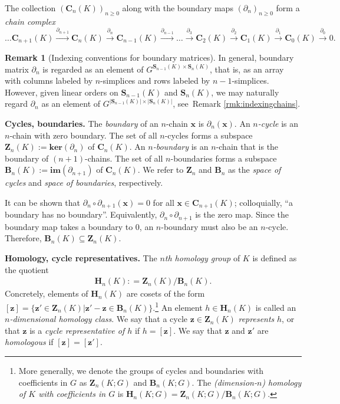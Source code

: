 \documentclass[utf8]{formatting_stuff/frontiersFPHY}
\newcommand{\Chains}{\mathbf{C}}
\newcommand{\Homologies}[0]{\mathbf{H}}
\newcommand{\Boundaries}[0]{\mathbf{B}}
\newcommand{\Simplices}[0]{\mathbf{S}}
\newcommand{\Cycles}[0]{\mathbf{Z}}
\newcommand{\optimalrep}{\mathbf{x}}
\newcommand{\cycle}{{\mathbf z}}
\theoremstyle{plain}
\theoremstyle{definition}
\newtheorem{remark}[theorem]{Remark}
\begin{document}
 
The collection  $(\Chains_n(K))_{n\geq 0}$ along with the boundary maps $(\partial_n)_{n\geq 0}$ form a \textit{chain complex}
\[\ldots \Chains_{n+1}(K) \xrightarrow{\partial_{n+1}} \Chains_{n}(K) \xrightarrow{\partial_{n}} \Chains_{n-1}(K) \xrightarrow{\partial_{n-1}} \ldots \xrightarrow{\partial_3} \Chains_2(K) \xrightarrow{\partial_2} \Chains_1(K) \xrightarrow{\partial_1} \Chains_0(K) \xrightarrow{\partial_0} 0. \]
 
\begin{remark}[{Indexing conventions for boundary matrices}]
\label{rmk:boundarymatrixindexing}
In general, boundary matrix $\partial_n$ is regarded as an element of $G^{\Simplices_{n-1}(K) \times \Simplices_{n}(K)}$, that is, as an array with columns labeled by $n$-simplices and rows labeled by $n-1$-simplices.  However, given linear orders on  $\Simplices_{n-1}(K)$ and $\Simplices_{n}(K)$, we may naturally regard $\partial_n$ as an element of $G^{|\Simplices_{n-1}(K)| \times |\Simplices_{n}(K)|}$, see\ Remark \ref{rmk:indexingchains}. 
\end{remark} 


\noindent \textbf{Cycles, boundaries.}  The \emph{boundary} of an $n$-chain $\optimalrep$ is  $\partial_n (\optimalrep)$.
An \textit{$n$-cycle} is an $n$-chain with zero boundary. The set of all $n$-cycles forms a subspace $\Cycles_n(K) := \textbf{ker}(\partial_n)$ of $\Chains_n(K).$ An \textit{$n$-boundary} is an $n$-chain that is the boundary of $(n+1)$-chains. The set of all $n$-boundaries forms a subspace $\Boundaries_n(K):= \textbf{im}(\partial_{n+1})$ of $\Chains_n(K).$   We refer to $\Cycles_n$ and $\Boundaries_n$ as the \emph{space of cycles} and \emph{space of boundaries}, respectively.

It can be shown that $\partial_n \circ \partial_{n+1}(\optimalrep) = 0$ for all $\optimalrep \in \Chains_{n+1}(K)$; colloquially,  ``a boundary has no boundary''. Equivalently,  $\partial_n \circ \partial_{n+1}$ is the zero map.
Since the boundary map takes a boundary to $0$, an $n$-boundary must also be an $n$-cycle. Therefore, $\Boundaries_n(K) \subseteq \Cycles_n(K)$. 




\noindent \textbf{Homology, cycle representatives.}  The \emph{$n$th homology group} of $K$ is defined as  the quotient
    \begin{align*}
        \Homologies_n(K): = \Cycles_n(K) / \Boundaries_n(K).
    \end{align*}
Concretely, elements of $\Homologies_n(K)$ are cosets of the form $[\cycle] = \{ \cycle'  \in \Cycles_n(K) | \cycle' - \cycle \in \Boundaries_n(K)\}$.\footnote{More generally, we denote the groups of cycles and boundaries with coefficients in $G$ as $\Cycles_n(K; G)$ and $\Boundaries_n(K; G)$.  The \emph{(dimension-$n$) homology of $K$ with coefficients in $G$} is $\Homologies_n(K; G) = \Cycles_n(K; G) / \Boundaries_n(K; G)$.}  An element $h \in \Homologies_n(K)$ is called an \emph{$n$-dimensional homology class}.  We say that a cycle $\cycle \in \Cycles_n(K)$ \emph{represents} $h$, or that $\cycle$ is a \emph{cycle representative of $h$} if $h = [\cycle]$.  We say that $\cycle$ and $\cycle'$ are \emph{homologous} if $[\cycle] = [\cycle']$.
\end{document}
